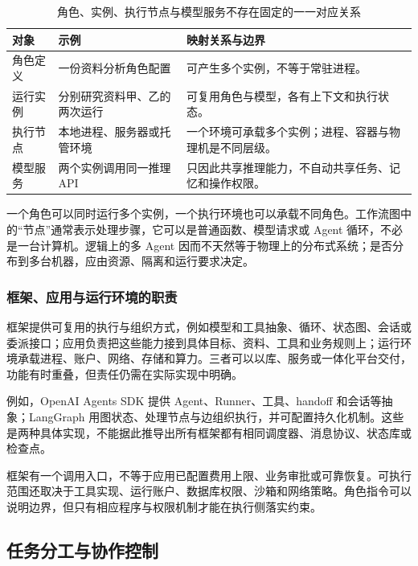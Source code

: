 \documentclass[11pt,a4paper]{article}
\begin{document}
\begin{table}[H]
\centering\small\renewcommand{\arraystretch}{1.18}
\begin{tabularx}{\textwidth}{P{2.6cm}P{4.5cm}L}
\toprule
\textbf{对象} & \textbf{示例} & \textbf{映射关系与边界}\\
\midrule
角色定义 & 一份资料分析角色配置 & 可产生多个实例，不等于常驻进程。\\
运行实例 & 分别研究资料甲、乙的两次运行 & 可复用角色与模型，各有上下文和执行状态。\\
执行节点 & 本地进程、服务器或托管环境 & 一个环境可承载多个实例；进程、容器与物理机是不同层级。\\
模型服务 & 两个实例调用同一推理 API & 只因此共享推理能力，不自动共享任务、记忆和操作权限。\\
\bottomrule
\end{tabularx}
\caption{角色、实例、执行节点与模型服务不存在固定的一一对应关系}
\end{table}

一个角色可以同时运行多个实例，一个执行环境也可以承载不同角色。工作流图中的“节点”通常表示处理步骤，它可以是普通函数、模型请求或 Agent 循环，不必是一台计算机。逻辑上的多 Agent 因而不天然等于物理上的分布式系统；是否分布到多台机器，应由资源、隔离和运行要求决定。

\subsubsection{框架、应用与运行环境的职责}

框架提供可复用的执行与组织方式，例如模型和工具抽象、循环、状态图、会话或委派接口；应用负责把这些能力接到具体目标、资料、工具和业务规则上；运行环境承载进程、账户、网络、存储和算力。三者可以以库、服务或一体化平台交付，功能有时重叠，但责任仍需在实际实现中明确。

例如，OpenAI Agents SDK 提供 Agent、Runner、工具、handoff 和会话等抽象；LangGraph 用图状态、处理节点与边组织执行，并可配置持久化机制\cite{agents-sdk,langgraph-overview,langgraph-persist}。这些是两种具体实现，不能据此推导出所有框架都有相同调度器、消息协议、状态库或检查点。

框架有一个调用入口，不等于应用已配置费用上限、业务审批或可靠恢复。可执行范围还取决于工具实现、运行账户、数据库权限、沙箱和网络策略。角色指令可以说明边界，但只有相应程序与权限机制才能在执行侧落实约束。

\subsection{任务分工与协作控制}
\label{sec:orchestration}
\end{document}
